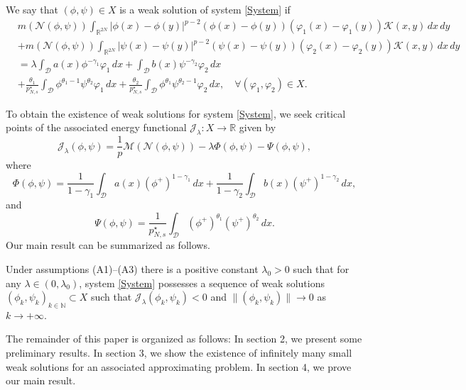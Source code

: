 \documentclass[reqno]{amsart}
\begin{document}
\begin{definition}\rm
We say that $(\phi,\psi)\in X$ is a weak solution of system \eqref{System} if
\begin{equation} \label{p11}
\begin{aligned}
&m(\mathcal{N}(\phi,\psi))\int_{\mathbb{R}^{2N}}|\phi(x)
 -\phi(y)|^{p-2}(\phi(x)-\phi(y))(\varphi_1(x)
 -\varphi_1(y))\mathcal{K}(x,y)\,dx\,dy \\
&+m(\mathcal{N}(\phi,\psi))\int_{\mathbb{R}^{2N}}|\psi(x)
-\psi(y)|^{p-2}(\psi(x)-\psi(y))(\varphi_2(x)-\varphi_2(y))\mathcal{K}(x,y)\,dx\,dy \\
&=\lambda \int_\mathcal{D} a(x)\phi^{-\gamma_1}\varphi_1\,dx+ \int_\mathcal{D}b(x)
 \psi^{-\gamma_2}\varphi_2\,dx \\
&+\frac{\theta_1}{p^\star_{N,s}}\int_\mathcal{D}\phi^{\theta_1-1}
\psi^{\theta_2}\varphi_1\,dx
+\frac{\theta_2}{p^\star_{N,s}}\int_\mathcal{D}\phi^{\theta_1}\psi^{\theta_2-1}
\varphi_2\,dx,\quad \forall (\varphi_1,\varphi_2)\in X.
\end{aligned}
\end{equation}
\end{definition}

To obtain the existence of  weak solutions for system \eqref{System}, 
we seek critical points of the associated energy functional 
$\mathcal{J}_\lambda:X\to\mathbb{R}$ given by
$$
\mathcal{J}_\lambda(\phi,\psi)=\frac{1}{p}\mathscr{M}(\mathcal{N}(\phi,\psi))
-\lambda \Phi(\phi,\psi)-\Psi(\phi,\psi), 
$$
where
$$
\Phi(\phi,\psi)=\frac{1}{1-\gamma_1}\int_\mathcal{D} a(x)(\phi^+)^{1-\gamma_1}\,dx
+\frac{1}{1-\gamma_2}\int_\mathcal{D}b(x)(\psi^+)^{1-\gamma_2}\,dx, 
$$
and
$$
\Psi(\phi,\psi)=\frac{1}{p^\star_{N,s}}\int_\mathcal{D}  
(\phi^+)^{\theta_1}(\psi^+)^{\theta_2}\,dx.
$$
Our main result can be summarized as follows.

\begin{theorem}\label{Theorem} 
Under  assumptions {\rm (A1)--(A3)} there is a positive constant $\lambda_0>0$ such 
that for any $\lambda\in (0,\lambda_0)$, system \eqref{System} possesses a sequence
 of weak solutions $(\phi_k,\psi_k)_{k\in\mathbb{N}}\subset X$ such that
 $\mathcal{J}_\lambda(\phi_k,\psi_k)< 0$ and $\|(\phi_k,\psi_k)\|\to 0$
 as $k\to +\infty$.
\end{theorem}

The remainder of this paper is organized as follows:
 In section 2, we present some preliminary results. 
 In section 3, we show the existence of infinitely many small weak solutions for 
 an associated approximating problem. 
 In section 4, we prove our main result.
 
\end{document}
